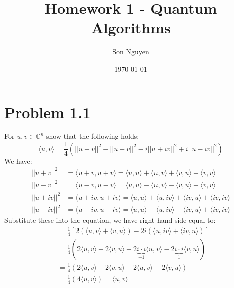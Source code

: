 \documentclass[12pt]{article}
\title{Homework 1 - Quantum Algorithms}
\author{Son Nguyen}
\date{\today}
\begin{document}
\maketitle

\section*{Problem 1.1}
For \(\bar{u}, \bar{v} \in \mathbb{C}^n\) show that the following holds:
\[ \langle u, v \rangle = \frac{1}{4}(||u+v||^2 - ||u-v||^2 - i||u+iv||^2 + i||u-iv||^2)\]
We have: 
\begin{align*}
    ||u+v||^2 &= \langle u+v, u+v \rangle = \langle u, u \rangle + \langle u, v \rangle + \langle v, u \rangle + \langle v, v \rangle \\
    ||u-v||^2 &= \langle u-v, u-v \rangle = \langle u, u \rangle - \langle u, v \rangle - \langle v, u \rangle + \langle v, v \rangle \\
    ||u+iv||^2 &= \langle u+iv, u+iv \rangle = \langle u, u \rangle + \langle u, iv \rangle + \langle iv, u \rangle + \langle iv, iv \rangle \\
    ||u-iv||^2 &= \langle u-iv, u-iv \rangle = \langle u, u \rangle - \langle u, iv \rangle - \langle iv, u \rangle + \langle iv, iv \rangle
\end{align*}
Substitute these into the equation, we have right-hand side equal to:
\begin{align*}
    &= \frac{1}{4} \left[2\left(\langle u, v \rangle + \langle v, u\rangle\right) - 2i \left(\langle u, iv\rangle + \langle iv, u\rangle\right)\right] \\
    &= \frac{1}{4} \left(2 \langle u, v \rangle + 2\langle v, u\rangle - 2\underbrace{i \cdot i}_{-1} \langle u, v\rangle - 2 \underbrace{i \cdot \bar{i}}_{1} \langle v, u\rangle\right) \\
    &= \frac{1}{4} \left(2 \langle u, v \rangle + 2\langle v, u\rangle + 2 \langle u, v\rangle - 2 \langle v, u\rangle\right) \\
    &= \frac{1}{4} \left(4 \langle u, v \rangle\right) = \langle u, v \rangle
\end{align*}
\end{document}
